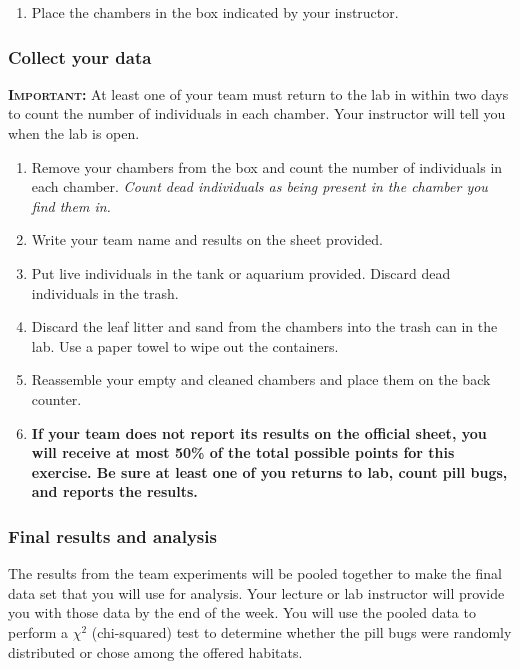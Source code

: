 \documentclass[12pt, hidelinks]{exam}
\newcommand\chisq{$\chi^2$}
\begin{document}
\begin{questions}
\begin{enumerate}
	\item Place the chambers in the box indicated by your instructor.
	
\end{enumerate}

\subsubsection*{Collect your data}


{\scshape \textbf{Important:}} At least one of your team must return to the lab in within two days to count the number of individuals in each chamber. Your instructor will tell you when the lab is open. 

\begin{enumerate}
	\item Remove your chambers from the box and count the number of individuals in each chamber. \emph{Count dead individuals as being present in the chamber you find them in.}
	
	\item Write your team name and results on the sheet provided.
	
	\item Put live individuals in the tank or aquarium provided. Discard dead individuals in the trash.
	
	\item Discard the leaf litter and sand from the chambers into the trash can in the lab. Use a paper towel to wipe out the containers.
	
	\item Reassemble your empty and cleaned chambers and place them on the back counter. 
	
	\item \textbf{If your team does not report its results on the official sheet, you will receive at most 50\% of the total possible points for this exercise. Be sure at least one of you returns to lab, count pill bugs, and reports the results.}
		
\end{enumerate}

\subsubsection*{Final results and analysis}

The results from the team experiments will be pooled together to make the final data set that you will use for analysis. Your lecture or lab instructor will provide you with those data by the end of the week. You will use the pooled data to perform a \chisq{} (chi-squared) test to determine whether the pill bugs were randomly distributed or chose among the offered habitats.


\end{questions}
\end{document}
